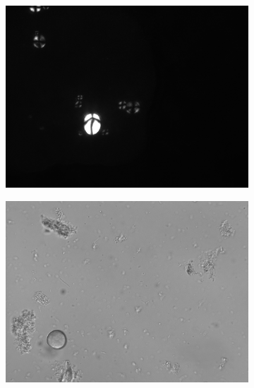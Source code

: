 \documentclass[
  b5paper,
]{book}
\begin{document}
\begin{figure}
\begin{minipage}[t]{0.50\linewidth}
{\begin{figure}[H]
{\centering \includegraphics[width=4.63in,height=\textheight]{figures/st2C3.2-mix.jpg}

}

\end{figure}

}

\end{minipage}%
\newline
\begin{minipage}[t]{0.50\linewidth}

{\centering 

\begin{figure}[H]

{\centering \includegraphics[width=4.63in,height=\textheight]{figures/st1B4-wheat.jpg}

}

\end{figure}

}
\end{minipage}
\end{figure}
\end{document}

